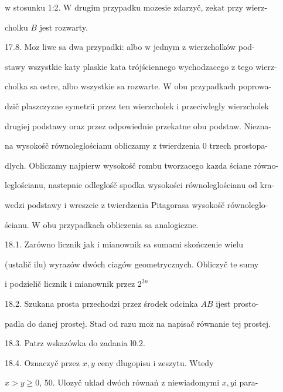 \documentclass[a4paper,12pt]{article}
\begin{document}
$\mathrm{w}$ stosunku 1:2. $\mathrm{W}$ drugim przypadku $\mathrm{m}\mathrm{o}\dot{\mathrm{z}}\mathrm{e}\mathrm{s}\mathrm{i}\mathrm{e}$ zdarzyč, $\dot{\mathrm{z}}\mathrm{e}\mathrm{k}\mathrm{a}\mathrm{t}$ przy wierz-

cholku $B$ jest rozwarty.

17.8. $\mathrm{M}\mathrm{o}\dot{\mathrm{z}}$ liwe sa dwa przypadki: albo $\mathrm{w}$ jednym $\mathrm{z}$ wierzcholków pod-

stawy wszystkie katy plaskie kata trójściennego wychodzacego $\mathrm{z}$ tego wierz-

cholka sa ostre, albo wszystkie sa rozwarte. $\mathrm{W}$ obu przypadkach poprowa-

dzič plaszczyzne symetrii przez ten wierzcholek $\mathrm{i}$ przeciwlegly wierzcholek

drugiej podstawy oraz przez odpowiednie przekatne obu podstaw. Niezna-

$\mathrm{n}\mathrm{a}$ wysokośč równoleglościanu obliczamy $\mathrm{z}$ twierdzenia $0$ trzech prostopa-

dlych. Obliczamy najpierw wysokośč rombu tworzacego $\mathrm{k}\mathrm{a}\dot{\mathrm{z}}\mathrm{d}\mathrm{a}$ ściane równo-

leglościanu, nastepnie odleglośč spodka wysokości równoleglościanu od kra-

wedzi podstawy $\mathrm{i}$ wreszcie $\mathrm{z}$ twierdzenia Pitagorasa wysokośč równoleglo-

ścianu. $\mathrm{W}$ obu przypadkach obliczenia sa analogiczne.

18.1. Zarówno licznik jak $\mathrm{i}$ mianownik sa sumami skończenie wielu

(ustalič $\mathrm{i}\mathrm{l}\mathrm{u}$) wyrazów dwóch ciagów geometrycznych. Obliczyč te sumy

$\mathrm{i}$ podzielič licznik $\mathrm{i}$ mianownik przez $2^{2n}$

18.2. Szukana prosta przechodzi przez środek odcinka $AB$ ijest prosto-

padla do danej prostej. Stad od razu $\mathrm{m}\mathrm{o}\dot{\mathrm{z}}$ na napisač równanie tej prostej.

18.3. Patrz wskazówka do zadania l0.2.

18.4. Oznaczyč przez $x, y$ ceny dlugopisu $\mathrm{i}$ zeszytu. Wtedy

$x >y\geq 0$, 50. Ulozyč uklad dwóch równań $\mathrm{z}$ niewiadomymi $x, y\mathrm{i}$ para-
\end{document}
